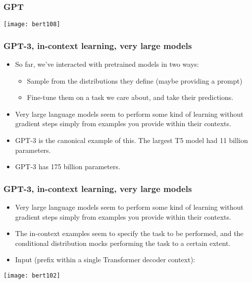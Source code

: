 \begin{frame}[fragile]\frametitle{GPT}

			\begin{center}
			\texttt{[image: bert108]}
			\end{center}		
			

\end{frame}



\begin{frame}[fragile]\frametitle{GPT-3, in-context learning, very large models}


      \begin{itemize}
			\item So far, we’ve interacted with pretrained models in two ways:
			      \begin{itemize}
						\item Sample from the distributions they define (maybe providing a prompt)
						\item Fine-tune them on a task we care about, and take their predictions.
						\end{itemize}
			\item Very large language models seem to perform some kind of learning without gradient  steps simply from examples you provide within their contexts.
			\item GPT-3 is the canonical example of this. The largest T5 model had 11 billion parameters.
			\item GPT-3 has 175 billion parameters.

			\end{itemize}


\end{frame}

\begin{frame}[fragile]\frametitle{GPT-3, in-context learning, very large models}


      \begin{itemize}
			\item Very large language models seem to perform some kind of learning without gradient  steps simply from examples you provide within their contexts.
			\item The in-context examples seem to specify the task to be performed, and the conditional  distribution mocks performing the task to a certain extent.
			\item Input (prefix within a single Transformer decoder context):
			\end{itemize}

			\begin{center}
			\texttt{[image: bert102]}
			\end{center}		
			

\end{frame}

